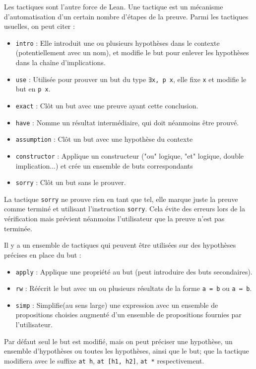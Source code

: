 \documentclass[a4paper, 12pt]{article}
\newcommand{\lean}[1]{\texttt{#1}}
\begin{document}
Les tactiques sont l'autre force de Lean. Une tactique est un mécanisme d'automatisation d'un certain nombre d'étapes de la preuve. Parmi les tactiques usuelles, on peut citer :
\begin{itemize}
    \item \lean{intro} : Elle introduit une ou plusieurs hypothèses dans le contexte (potentiellement avec un nom), et modifie le but pour enlever les hypothèses dans la chaîne d'implications.
    \item \lean{use} : Utilisée pour prouver un but du type \lean{∃x, p x}, elle fixe \lean{x} et modifie le but en \lean{p x}.
    \item \lean{exact} : Clôt un but avec une preuve ayant cette conclusion.
    \item \lean{have} : Nomme un résultat intermédiaire, qui doit néanmoins être prouvé.
    \item \lean{assumption} : Clôt un but avec une hypothèse du contexte
    \item \lean{constructor} : Applique un constructeur ("ou" logique, "et" logique, double implication...) et crée un ensemble de buts correspondants
    \item \lean{sorry} : Clôt un but sans le prouver.
\end{itemize}

La tactique \lean{sorry} ne prouve rien en tant que tel, elle marque juste la preuve comme terminé et utilisant l'instruction \lean{sorry}. Cela évite des erreurs lors de la vérification mais prévient néanmoins l'utilisateur que la preuve n'est pas terminée.

Il y a un ensemble de tactiques qui peuvent être utilisées sur des hypothèses précises en place du but :
\begin{itemize}
    \item \lean{apply} : Applique une propriété au but (peut introduire des buts secondaires).
    \item \lean{rw} : Réécrit le but avec un ou plusieurs résultats de la forme \lean{a = b} ou \lean{a ↔ b}.
    \item \lean{simp} : Simplifie(au sens large) une expression avec un ensemble de propositions choisies augmenté d'un ensemble de propositions fournies par l'utilisateur.
\end{itemize}

Par défaut seul le but est modifié, mais on peut préciser une hypothèse, un ensemble d'hypothèses ou toutes les hypothèses, ainsi que le but; que la tactique modifiera avec le suffixe \lean{at h}, \lean{at [h1, h2]}, \lean{at *} respectivement.
\end{document}
